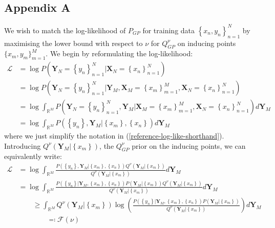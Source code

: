 \documentclass[twoside,11pt]{article}
\begin{document}
\subsection{Appendix A}\label{svgp-kld-bayesian}
We wish to match the log-likelihood of $P_{GP}$ for training data $\left\{ x_n, y_n\right\}_{n=1}^{N}$ by maximising the lower bound with respect to $\nu$ for $Q_{GP}^{\nu}$ on inducing points $\{x_m, y_m\}_{m=1}^{M}$. We begin by reformulating the log-likelihood:
\begin{align}
    \mathcal{L} &= \log P\left(\mathbf{Y}_{N} =\left\{ y_n\right\}_{n=1}^N \big\vert \mathbf{X}_N = \left\{ x_n\right\}_{n=1}^N\right) 
    \\&= \log P\left(\mathbf{Y}_{N} =\left\{ y_n\right\}_{n=1}^N \big\vert \mathbf{Y}_M, \mathbf{X}_M = \left\{ x_m\right\}_{m=1}^M, \mathbf{X}_N = \left\{ x_n\right\}_{n=1}^N\right) 
    \\&= \log \int_{\mathbb{R}^M} P\left(\mathbf{Y}_{N} =\left\{ y_n\right\}_{n=1}^N, \mathbf{Y}_M \big\vert \mathbf{X}_M = \left\{ x_m\right\}_{m=1}^M, \mathbf{X}_N = \left\{ x_n\right\}_{n=1}^N\right) d\mathbf{Y}_M 
    \\&= \log \int_{\mathbb{R}^M} P\left(\left\{ y_n\right\}, \mathbf{Y}_M \big\vert \left\{ x_m\right\},  \left\{ x_n\right\}\right) d\mathbf{Y}_M 
    \label{reference-log-like-shorthand}
\end{align}
where we just simplify the notation in (\ref{reference-log-like-shorthand}). Introducing $Q^{\nu}\left(\mathbf{Y}_M \big\vert \left\{ x_m\right\} \right)$, the $Q_{GP}^{\nu}$ prior on the inducing points, we can equivalently write:
\begin{align}
            \mathcal{L} &= \log \int_{\mathbb{R}^M} \frac{P\left(\left\{ y_n\right\}, \mathbf{Y}_M \big\vert \left\{ x_m\right\}, \left\{ x_n\right\}\right)Q^{\nu}\left(\mathbf{Y}_M \big\vert \left\{ x_m\right\} \right)}{Q^{\nu}\left(\mathbf{Y}_M \big\vert \left\{ x_m\right\} \right)} d\mathbf{Y}_M 
    \\&= \log \int_{\mathbb{R}^M} \frac{P\left(\left\{ y_n\right\} \big\vert \mathbf{Y}_M , \left\{ x_m\right\}, \left\{ x_n\right\}\right)P\left(\mathbf{Y}_M \big\vert \left\{ x_m\right\}\right)Q^{\nu}\left(\mathbf{Y}_M \big\vert \left\{ x_m\right\} \right)}{Q^{\nu}\left(\mathbf{Y}_M \big\vert \left\{ x_m\right\} \right)} d\mathbf{Y}_M 
    \\&\qquad\geq  \int_{\mathbb{R}^M} Q^{\nu}\left(\mathbf{Y}_M \big\vert \left\{ x_m\right\} \right) \log \left(\frac{P\left(\left\{ y_n\right\} \big\vert \mathbf{Y}_M , \left\{ x_m\right\}, \left\{ x_n\right\}\right)P\left(\mathbf{Y}_M \big\vert \left\{ x_m\right\}\right)}{Q^{\nu}\left(\mathbf{Y}_M \big\vert \left\{ x_m\right\} \right)} \right)d\mathbf{Y}_M 
    \label{log-like-jensen}
    \\ & \qquad\qquad \eqqcolon \mathcal{F(\nu)}
\end{align}
\end{document}
